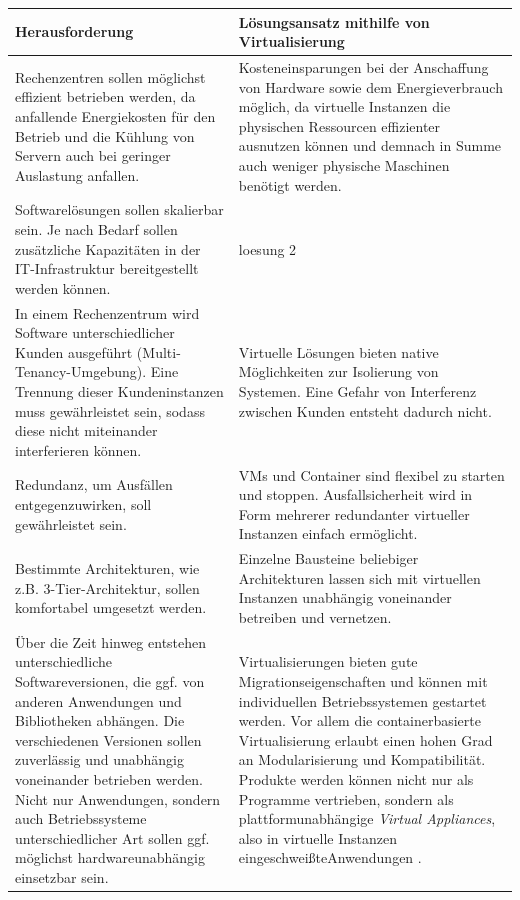 \documentclass[../main.tex]{subfiles}
\begin{document}
		\begin{table}[htp]
			\begin{centering}
			\begin{tabularx}{\textwidth}{>{\hsize=1\hsize}X>{\hsize=1\hsize}X}
				\hline
				\textbf{Herausforderung} & \textbf{Lösungsansatz mithilfe von Virtualisierung} \\
				\hline
				Rechenzentren sollen möglichst effizient betrieben werden, da anfallende Energiekosten für den Betrieb und die Kühlung von Servern auch bei geringer Auslastung anfallen.
				& Kosteneinsparungen bei der Anschaffung von Hardware sowie dem Energieverbrauch möglich, da virtuelle Instanzen die physischen Ressourcen effizienter ausnutzen können und demnach in Summe auch weniger physische Maschinen benötigt werden. \\
				\hline
				Softwarelösungen sollen skalierbar sein. Je nach Bedarf sollen zusätzliche Kapazitäten in der IT-Infrastruktur bereitgestellt werden können.
				& loesung 2 \\
				\hline
				In einem Rechenzentrum wird Software unterschiedlicher Kunden ausgeführt (Multi-Tenancy-Umgebung). Eine Trennung dieser Kundeninstanzen muss gewährleistet sein, sodass diese nicht miteinander interferieren können.
				& Virtuelle Lösungen bieten native Möglichkeiten zur Isolierung von Systemen. Eine Gefahr von Interferenz zwischen Kunden entsteht dadurch nicht. \\
				\hline
				Redundanz, um Ausfällen entgegenzuwirken, soll gewährleistet sein.
				& VMs und Container sind flexibel zu starten und stoppen. Ausfallsicherheit wird in Form mehrerer redundanter virtueller Instanzen einfach ermöglicht. \\
				\hline
				Bestimmte Architekturen, wie z.B. 3-Tier-Architektur, sollen komfortabel umgesetzt werden.
				& Einzelne Bausteine beliebiger Architekturen lassen sich mit virtuellen Instanzen unabhängig voneinander betreiben und vernetzen. \\
				\hline
				Über die Zeit hinweg entstehen unterschiedliche Softwareversionen, die ggf. von anderen Anwendungen und Bibliotheken abhängen. Die verschiedenen Versionen sollen zuverlässig und unabhängig voneinander betrieben werden. Nicht nur Anwendungen, sondern auch Betriebssysteme unterschiedlicher Art sollen ggf. möglichst hardwareunabhängig einsetzbar sein.
				& Virtualisierungen bieten gute Migrationseigenschaften und können mit individuellen Betriebssystemen gestartet werden. Vor allem die containerbasierte Virtualisierung erlaubt einen hohen Grad an Modularisierung und Kompatibilität. Produkte werden können nicht nur als Programme vertrieben, sondern als plattformunabhängige \emph{Virtual Appliances}, also in virtuelle Instanzen \glqq{}eingeschweißte\grqq{}Anwendungen \cite[S.672f.]{tanenbaumOS}. \\

\end{tabularx}
\end{centering}
\end{table}
\end{document}

